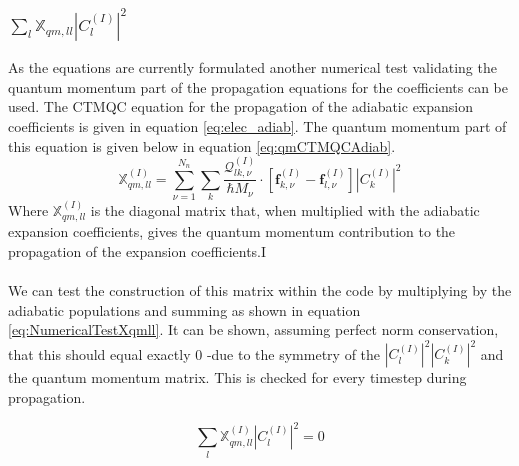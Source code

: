 \subsubsection{$\sum_{l} \mathbb{X}_{qm, ll} |C_{l}^{(I)}|^2$}
\label{sect:sumXqmll}
As the equations are currently formulated another numerical test validating the quantum momentum part of the propagation equations for the coefficients can be used. The CTMQC equation for the propagation of the adiabatic expansion coefficients is given in equation \eqref{eq:elec_adiab}. The quantum momentum part of this equation is given below in equation \eqref{eq:qmCTMQCAdiab}. 
\begin{equation}
  \mathbb{X}_{qm, ll}^{(I)} = \sum_{\nu=1}^{N_n}\sum_{k} \frac{\mathcal{Q}_{lk, \nu}^{(I)}}{\hbar     M_\nu} \cdot \left[ \mathbf{f}_{k,\nu}^{(I)} - \mathbf{f}_{l,\nu}^{(I)}   \right] |C_{k}^{(I)}|^2
  \label{eq:qmCTMQCAdiab}
\end{equation}
Where $\mathbb{X}_{qm, ll}^{(I)}$ is the diagonal matrix that, when multiplied with the adiabatic expansion coefficients, gives the quantum momentum contribution to the propagation of the expansion coefficients.I
\\\\
We can test the construction of this matrix within the code by multiplying by the adiabatic populations and summing as shown in equation \eqref{eq:NumericalTestXqmll}. It can be shown, assuming perfect norm conservation, that this should equal exactly 0 -due to the symmetry of the $|C_{l}^{(I)}|^2|C_{k}^{(I)}|^2$ and the quantum momentum matrix. This is checked for every timestep during propagation.

\begin{equation}
  \sum_{l} \mathbb{X}_{qm, ll}^{(I)} |C_{l}^{(I)}|^2 = 0
  \label{eq:NumericalTestXqmll}
\end{equation}


